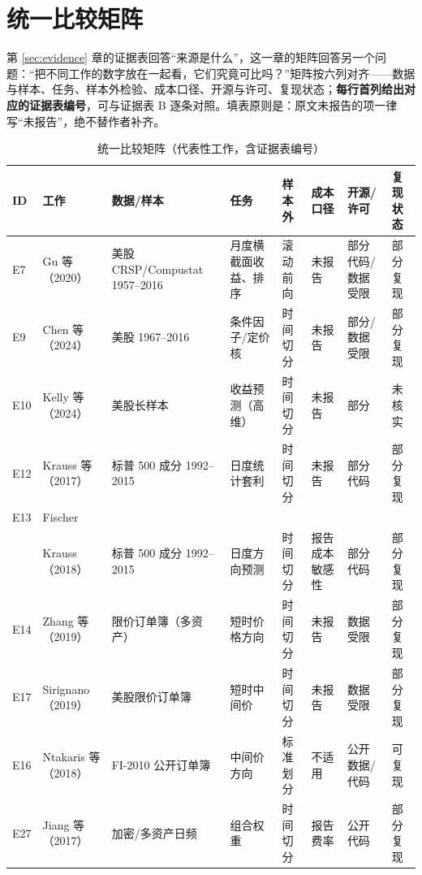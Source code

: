 \section{统一比较矩阵}\label{sec:matrix}

第 \ref{sec:evidence} 章的证据表回答“来源是什么”，这一章的矩阵回答另一个问题：“把不同工作的数字放在一起看，它们究竟可比吗？”矩阵按六列对齐——数据与样本、任务、样本外检验、成本口径、开源与许可、复现状态；\textbf{每行首列给出对应的证据表编号}，可与证据表 B 逐条对照。填表原则是：原文未报告的项一律写“未报告”，绝不替作者补齐。

{\small
\begin{xltabular}{\textwidth}{@{}>{\raggedright\arraybackslash}p{0.7cm}>{\raggedright\arraybackslash}X>{\raggedright\arraybackslash}X>{\raggedright\arraybackslash}p{1.9cm}>{\raggedright\arraybackslash}p{1.2cm}>{\raggedright\arraybackslash}p{1.2cm}>{\raggedright\arraybackslash}p{1.2cm}>{\raggedright\arraybackslash}p{1.2cm}@{}}
\caption{统一比较矩阵（代表性工作，含证据表编号）}\\
\toprule
ID & 工作 & 数据/样本 & 任务 & 样本外 & 成本口径 & 开源/许可 & 复现状态 \\
\midrule
\endhead
E7 & Gu 等\allowbreak（2020） & 美股 CRSP\slash Compustat 1957--2016 & 月度横截面收益、排序 & 滚动前向 & 未报告 & 部分代码/数据受限 & 部分复现 \\
E9 & Chen 等\allowbreak（2024） & 美股 1967--2016 & 条件因子/定价核 & 时间切分 & 未报告 & 部分/数据受限 & 部分复现 \\
E10 & Kelly 等\allowbreak（2024） & 美股长样本 & 收益预测（高维） & 时间切分 & 未报告 & 部分 & 未核实 \\
E12 & Krauss 等\allowbreak（2017） & 标普 500 成分 1992--2015 & 日度统计套利 & 时间切分 & 未报告 & 部分代码 & 部分复现 \\
E13 & Fischer \\& Krauss\allowbreak（2018） & 标普 500 成分 1992--2015 & 日度方向预测 & 时间切分 & 报告成本敏感性 & 部分代码 & 部分复现 \\
E14 & Zhang 等\allowbreak（2019） & 限价订单簿（多资产） & 短时价格方向 & 时间切分 & 未报告 & 数据受限 & 部分复现 \\
E17 & Sirignano\allowbreak（2019） & 美股限价订单簿 & 短时中间价 & 时间切分 & 未报告 & 数据受限 & 部分复现 \\
E16 & Ntakaris 等\allowbreak（2018） & FI-2010 公开订单簿 & 中间价方向 & 标准划分 & 不适用 & 公开数据/代码 & 可复现 \\
E27 & Jiang 等\allowbreak（2017） & 加密/多资产日频 & 组合权重 & 时间切分 & 报告费率 & 公开代码 & 部分复现 \\

\end{xltabular}}
